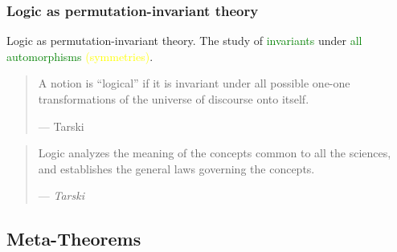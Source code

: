 \documentclass[UTF8,aspectratio=43,11pt,colorlinks,compress,openany]{beamer}%
\begin{document}
\begin{frame}\frametitle{Logic as permutation-invariant theory}
	\begin{block}{Logic as permutation-invariant theory.}
		The study of \textcolor{green}{invariants} under \textcolor{green}{all automorphisms} \textcolor{yellow}{(symmetries)}.
	\end{block}
	\begin{quote}
		A notion is ``logical'' if it is invariant under all possible one-one transformations of the universe of discourse onto itself.\par
		\hfill --- {Tarski}
	\end{quote}
	\begin{quote}
		Logic analyzes the meaning of the concepts common to all the sciences, and establishes the general laws governing the concepts.\par\hfill --- \textsl{Tarski}
	\end{quote}
\end{frame}

\subsection{Meta-Theorems}
\end{document}
